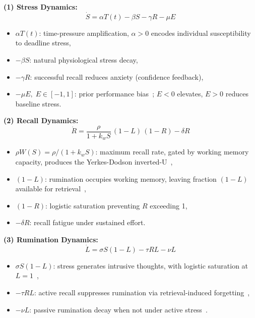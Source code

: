 \medskip\noindent\textbf{(1) Stress Dynamics:}
\begin{equation}
  \dot{S} = \alpha T(t) - \beta S - \gamma R - \mu E
  \label{eq:S}
\end{equation}
\begin{itemize}
  \item $\alpha T(t)$: time-pressure amplification, $\alpha>0$
    encodes individual susceptibility to deadline stress,
  \item $-\beta S$: natural physiological stress decay,
  \item $-\gamma R$: successful recall reduces anxiety (confidence
    feedback),
  \item $-\mu E,\;E\in[-1,1]$: prior performance
    bias~\cite{bandura1977}; $E<0$ elevates, $E>0$ reduces
    baseline stress.
\end{itemize}

\medskip\noindent\textbf{(2) Recall Dynamics:}
\begin{equation}
  \dot{R} = \frac{\rho}{1+k_w S}\,(1-L)\,(1-R) - \delta R
  \label{eq:R}
\end{equation}
\begin{itemize}
  \item $\rho W(S) = \rho/(1+k_w S)$: maximum recall rate, gated
    by working memory capacity, produces the Yerkes-Dodson
    inverted-U~\cite{yerkes1908,baddeley1986},
  \item $(1-L)$: rumination occupies working memory, leaving
    fraction $(1-L)$ available for retrieval~\cite{eysenck2007},
  \item $(1-R)$: logistic saturation preventing $R$ exceeding 1,
  \item $-\delta R$: recall fatigue under sustained effort.
\end{itemize}

\medskip\noindent\textbf{(3) Rumination Dynamics:}
\begin{equation}
  \dot{L} = \sigma S(1-L) - \tau R L - \nu L
  \label{eq:L}
\end{equation}
\begin{itemize}
  \item $\sigma S(1-L)$: stress generates intrusive thoughts,
    with logistic saturation at $L=1$~\cite{eysenck2007},
  \item $-\tau R L$: active recall suppresses rumination via
    retrieval-induced forgetting~\cite{anderson2003},
  \item $-\nu L$: passive rumination decay when not under active stress~\cite{borkovec1994}.
\end{itemize}

